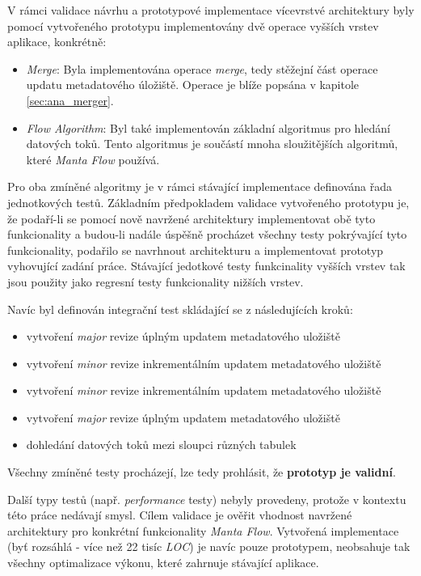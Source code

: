 V rámci validace návrhu a prototypové implementace vícevrstvé architektury byly pomocí vytvořeného prototypu implementovány dvě operace vyšších vrstev aplikace, konkrétně:

\begin{itemize}
   \item{\textit{Merge}}: Byla implementována operace \textit{merge}, tedy stěžejní část operace updatu metadatového úložiště. Operace je blíže popsána v kapitole \ref{sec:ana_merger}.
   \item{\textit{Flow Algorithm}}: Byl také implementován základní algoritmus pro hledání datových toků. Tento algoritmus je součástí mnoha sloužitějších algoritmů, které \textit{Manta Flow} používá.
\end{itemize}

Pro oba zmíněné algoritmy je v rámci stávající implementace definována řada jednotkových testů. Základním předpokladem validace vytvořeného prototypu je, že podaří-li se pomocí nově navržené architektury implementovat obě tyto funkcionality a budou-li nadále úspěšně procházet všechny testy pokrývající tyto funkcionality, podařilo se navrhnout architekturu a implementovat prototyp vyhovující zadání práce. Stávající jedotkové testy funkcinality vyšších vrstev tak jsou použity jako regresní testy funkcionality nižších vrstev.

Navíc byl definován integrační test skládající se z následujících kroků:

\begin{itemize}
   \item vytvoření \textit{major} revize úplným updatem metadatového uložiště
   \item vytvoření \textit{minor} revize inkrementálním updatem metadatového uložiště
   \item vytvoření \textit{minor} revize inkrementálním updatem metadatového uložiště
   \item vytvoření \textit{major} revize úplným updatem metadatového uložiště
   \item dohledání datových toků mezi sloupci různých tabulek
\end{itemize}

Všechny zmíněné testy procházejí, lze tedy prohlásit, že \textbf{prototyp je validní}.

Další typy testů (např. \textit{performance} testy) nebyly provedeny, protože v kontextu této práce nedávají smysl. Cílem validace je ověřit vhodnost navržené architektury pro konkrétní funkcionality \textit{Manta Flow}. Vytvořená implementace (byť rozsáhlá - více než 22 tisíc \textit{LOC}) je navíc pouze prototypem, neobsahuje tak všechny optimalizace výkonu, které zahrnuje stávající aplikace.
